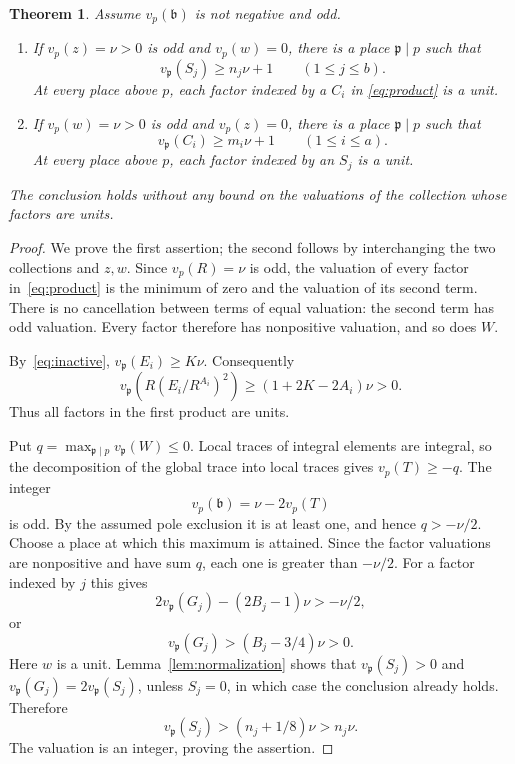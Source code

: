 \documentclass[11pt,a4paper]{article}
\newtheorem{theorem}{Theorem}[section]
\begin{document}
\begin{theorem}\label{thm:two-collections}
Assume $v_p(\mathfrak b)$ is not negative and odd.
\begin{enumerate}
\item If $v_p(z)=\nu>0$ is odd and $v_p(w)=0$, there is a place
$\mathfrak p\mid p$ such that
\[
              v_{\mathfrak p}(S_j)\ge n_j\nu+1
                       \qquad(1\le j\le b).
\]
At every place above $p$, each factor indexed by a $C_i$ in
\eqref{eq:product} is a unit.
\item If $v_p(w)=\nu>0$ is odd and $v_p(z)=0$, there is a place
$\mathfrak p\mid p$ such that
\[
              v_{\mathfrak p}(C_i)\ge m_i\nu+1
                       \qquad(1\le i\le a).
\]
At every place above $p$, each factor indexed by an $S_j$ is a unit.
\end{enumerate}
The conclusion holds without any bound on the valuations of the
collection whose factors are units.
\end{theorem}
\begin{proof}
We prove the first assertion; the second follows by interchanging
the two collections and $z,w$. Since $v_p(R)=\nu$ is odd,
the valuation of every factor in~\eqref{eq:product} is the minimum
of zero and the valuation of its second term. There is no cancellation
between terms of equal valuation: the second term has odd valuation.
Every factor therefore has nonpositive valuation, and so does $W$.

By~\eqref{eq:inactive}, $v_{\mathfrak p}(E_i)\ge K\nu$.
Consequently
\[
 v_{\mathfrak p}\left(R(E_i/R^{A_i})^2\right)
 \ge(1+2K-2A_i)\nu>0.
\]
Thus all factors in the first product are units.

Put $q=\max_{\mathfrak p\mid p}v_{\mathfrak p}(W)\le0$.
Local traces of integral elements are integral, so the decomposition
of the global trace into local traces gives $v_p(T)\ge-q$.
The integer
\[
                    v_p(\mathfrak b)=\nu-2v_p(T)
\]
is odd. By the assumed pole exclusion it is at least one, and hence
$q>-\nu/2$. Choose a place at which this maximum is attained.
Since the factor valuations are nonpositive and have sum $q$,
each one is greater than $-\nu/2$. For a factor indexed by $j$ this gives
\[
           2v_{\mathfrak p}(G_j)-(2B_j-1)\nu>-\nu/2,
\]
or
\[
              v_{\mathfrak p}(G_j)>(B_j-3/4)\nu>0.
\]
Here $w$ is a unit. Lemma~\ref{lem:normalization} shows that
$v_{\mathfrak p}(S_j)>0$ and
$v_{\mathfrak p}(G_j)=2v_{\mathfrak p}(S_j)$, unless $S_j=0$,
in which case the conclusion already holds. Therefore
\[
 v_{\mathfrak p}(S_j)>(n_j+1/8)\nu>n_j\nu.
\]
The valuation is an integer, proving the assertion.
\end{proof}
\end{document}
